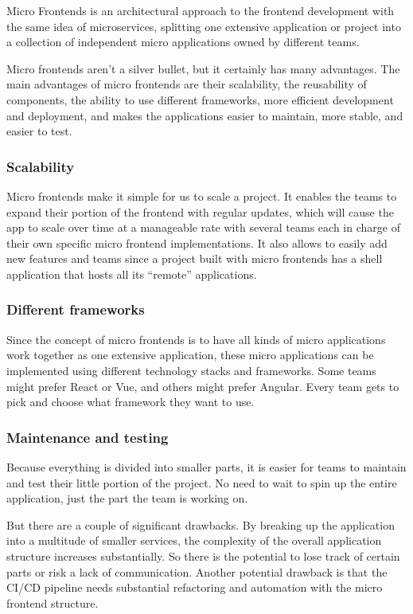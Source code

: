 Micro Frontends is an architectural approach to the frontend development with the same idea of microservices, splitting one extensive application or project into a collection of independent micro applications owned by different teams. 

Micro frontends aren’t a silver bullet, but it certainly has many advantages.
The main advantages of micro frontends are their scalability, the reusability of components, the ability to use different frameworks, more efficient development and deployment, and makes the applications easier to maintain, more stable, and easier to test.
\subsubsection{Scalability}
Micro frontends make it simple for us to scale a project. It enables the teams to expand their portion of the frontend with regular updates, which will cause the app to scale over time at a manageable rate with several teams each in charge of their own specific micro frontend implementations. It also allows to easily add new features and teams since a project built with micro frontends has a shell application that hosts all its “remote” applications.
\subsubsection{Different frameworks}
Since the concept of micro frontends is to have all kinds of micro applications work together as one extensive application, these micro applications can be implemented using different technology stacks and frameworks. Some teams might prefer React or Vue, and others might prefer Angular. Every team gets to pick and choose what framework they want to use.
\subsubsection{Maintenance and testing}
Because everything is divided into smaller parts, it is easier for teams to maintain and test their little portion of the project. No need to wait to spin up the entire application, just the part the team is working on.

But there are a couple of significant drawbacks. By breaking up the application into a multitude of smaller services, the complexity of the overall application structure increases substantially. So there is the potential to lose track of certain parts or risk a lack of communication. Another potential drawback is that the CI/CD pipeline needs substantial refactoring and automation with the micro frontend structure.

